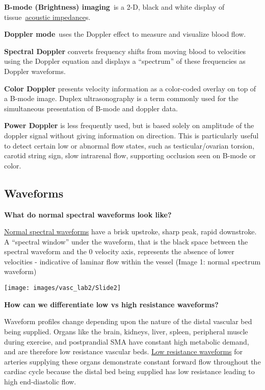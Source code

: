 \documentclass[
]{book}
\begin{document}
\textbf{B-mode (Brightness) imaging}~is a 2-D, black and white display of
tissue~\href{https://en.wikipedia.org/wiki/Acoustic_impedance}{acoustic
impedance}s.

\textbf{Doppler mode}~uses the Doppler effect to measure and visualize blood
flow.

\textbf{Spectral Doppler} converts frequency shifts from moving blood to
velocities using the Doppler equation and displays a ``spectrum'' of these
frequencies as Doppler waveforms.

\textbf{Color Doppler} presents velocity information as a color-coded overlay
on top of a B-mode image. Duplex ultrasonography is a term commonly used
for the simultaneous presentation of B-mode and doppler data.

\textbf{Power Doppler} is less frequently used, but is based solely on
amplitude of the doppler signal without giving information on direction.
This is particularly useful to detect certain low or abnormal flow
states, such as testicular/ovarian torsion, carotid string sign, slow
intrarenal flow, supporting occlusion seen on B-mode or
color.\citep{pellerito2019}

\hypertarget{waveforms}{%
\subsection{Waveforms}\label{waveforms}}

\textbf{What do normal spectral waveforms look like?}

\uline{Normal spectral waveforms} have a brisk upstroke, sharp
peak, rapid downstroke. A ``spectral window'' under the waveform, that is
the black space between the spectral waveform and the 0 velocity axis,
represents the absence of lower velocities - indicative of laminar flow
within the vessel (Image 1: normal spectrum waveform)

\texttt{[image: images/vasc\_lab2/Slide2]}

\textbf{How can we differentiate low vs high resistance waveforms?}

Waveform profiles change depending upon the nature of the distal
vascular bed being supplied. Organs like the brain, kidneys, liver,
spleen, peripheral muscle during exercise, and postprandial SMA have
constant high metabolic demand, and are therefore low resistance
vascular beds. \uline{Low resistance waveforms} for arteries
supplying these organs demonstrate constant forward flow throughout the
cardiac cycle because the distal bed being supplied has low resistance
leading to high end-diastolic flow.
\end{document}
